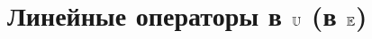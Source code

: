 \documentclass[../main.tex]{subfiles}
\begin{document}
\chapter{Линейные операторы в $\mathbb{U}$\; (в $\mathbb{E}$)}

\end{document}
